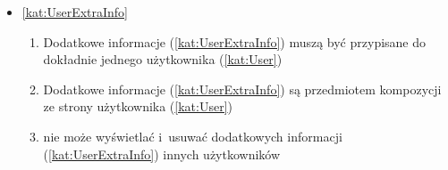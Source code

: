 \begin{itemize}[label={\textbf{Reguły dla}}, wide, labelwidth=!, labelindent=0pt]
    \item\ref{kat:UserExtraInfo}\mynobreakpar
    \begin{enumerate}[label={\textbf{REG/0/\protect\twodigits{\arabic{enumi}}}}, wide, labelwidth=!, align=left, leftmargin=3cm, resume]
        \item Dodatkowe informacje (\ref{kat:UserExtraInfo}) muszą być przypisane do dokładnie jednego użytkownika (\ref{kat:User})
        \item Dodatkowe informacje (\ref{kat:UserExtraInfo}) są przedmiotem kompozycji ze strony użytkownika (\ref{kat:User})
        \item {} nie może wyświetlać i~usuwać dodatkowych informacji (\ref{kat:UserExtraInfo}) innych użytkowników
    \end{enumerate}

\end{itemize}

